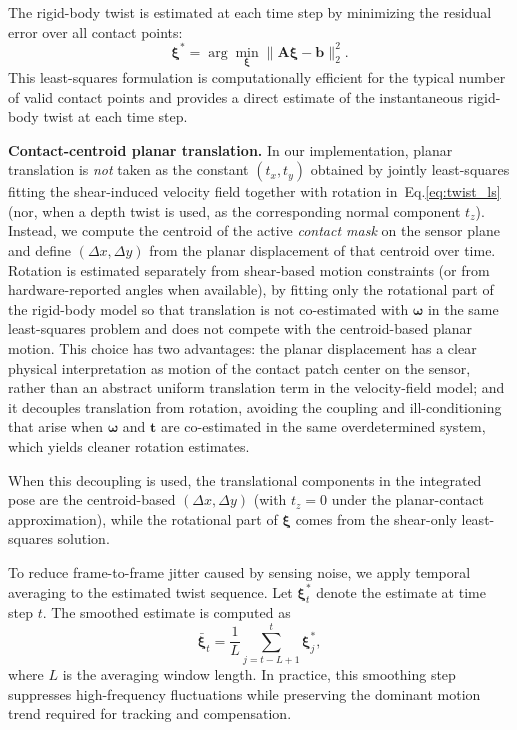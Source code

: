 \documentclass[letterpaper,10pt,journal,twoside]{IEEEtran}
\begin{document}
The rigid-body twist is estimated at each time step by minimizing the residual error over all contact points:
\begin{equation}
\boldsymbol{\xi}^{*} = \arg\min_{\boldsymbol{\xi}} \| \mathbf{A}\boldsymbol{\xi} - \mathbf{b} \|_2^2.
\label{eq:twist_ls}
\end{equation}
This least-squares formulation is computationally efficient for the typical number of valid contact points and provides a direct estimate of the instantaneous rigid-body twist at each time step.

\textbf{Contact-centroid planar translation.}
In our implementation, planar translation is \emph{not} taken as the constant $(t_x,t_y)$ obtained by jointly least-squares fitting the shear-induced velocity field together with rotation in~Eq.\eqref{eq:twist_ls} (nor, when a depth twist is used, as the corresponding normal component $t_z$). Instead, we compute the centroid of the active \emph{contact mask} on the sensor plane and define $(\Delta x,\Delta y)$ from the planar displacement of that centroid over time.
Rotation is estimated separately from shear-based motion constraints (or from hardware-reported angles when available), by fitting only the rotational part of the rigid-body model so that translation is not co-estimated with $\boldsymbol{\omega}$ in the same least-squares problem and does not compete with the centroid-based planar motion.
This choice has two advantages: the planar displacement has a clear physical interpretation as motion of the contact patch center on the sensor, rather than an abstract uniform translation term in the velocity-field model; and it decouples translation from rotation, avoiding the coupling and ill-conditioning that arise when $\boldsymbol{\omega}$ and $\mathbf{t}$ are co-estimated in the same overdetermined system, which yields cleaner rotation estimates.

When this decoupling is used, the translational components in the integrated pose are the centroid-based $(\Delta x,\Delta y)$ (with $t_z=0$ under the planar-contact approximation), while the rotational part of $\boldsymbol{\xi}$ comes from the shear-only least-squares solution.

To reduce frame-to-frame jitter caused by sensing noise, we apply temporal averaging to the estimated twist sequence. Let $\boldsymbol{\xi}^{*}_t$ denote the estimate at time step $t$. The smoothed estimate is computed as
\begin{equation}
\bar{\boldsymbol{\xi}}_t = \frac{1}{L}\sum_{j=t-L+1}^{t}\boldsymbol{\xi}^{*}_j,
\end{equation}
where $L$ is the averaging window length. In practice, this smoothing step suppresses high-frequency fluctuations while preserving the dominant motion trend required for tracking and compensation.
\end{document}

